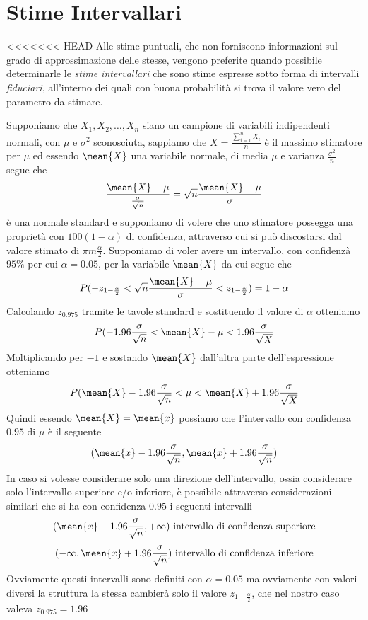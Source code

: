 \documentclass[a4paper,12pt, oneside]{book}
\begin{document}
\section{Stime Intervallari}
<<<<<<< HEAD
Alle stime puntuali, che non forniscono informazioni sul grado di approssimazione delle stesse, vengono preferite quando possibile
determinarle le \emph{stime intervallari} che sono stime espresse sotto forma di intervalli \emph{fiduciari}, 
all’interno dei quali con buona probabilità si trova il valore vero del parametro da stimare.\newline

Supponiamo che $X_1, X_2, \dots, X_n$ siano un campione di variabili indipendenti normali, con $\mu$ e $\sigma^2$
sconosciuta, sappiamo che $\overline{X} = \frac{\sum _{i = 1}^n X_i}{n}$ è il massimo stimatore per $\mu$ ed essendo
$\mean{X}$ una variabile normale, di media $\mu$ e varianza $\frac{\sigma^2}{n}$ segue che
\[ \frac{\mean{X} - \mu}{\frac{\sigma}{\sqrt{n}}} = \sqrt{n} \frac{\mean{X} - \mu}{\sigma} \]
è una normale standard  e supponiamo di volere che uno stimatore possegga una proprietà con $100(1 - \alpha)$ di
confidenza, attraverso cui si può discostarsi dal valore stimato di $\pi m \frac{\alpha}{2}$.\newline
Supponiamo di voler avere un intervallo, con confidenzà $95\%$ per cui $\alpha = 0.05$, per la variabile $\mean{X}$ 
da cui segue che
\[ P(-z_{1 - \frac{\alpha}{2}} < \sqrt{n} \frac{\mean{X} - \mu}{\sigma} < z_{1 - \frac{\alpha}{2}}) = 1 - \alpha \]
Calcolando $z_{0.975}$ tramite le tavole standard e sostituendo il valore di $\alpha$ otteniamo
\[ P(-1.96 \frac{\sigma}{\sqrt{n}} < \mean{X} - \mu < 1.96 \frac{\sigma}{\sqrt{X}} \]
Moltiplicando per $-1$ e sostando $\mean{X}$ dall'altra parte dell'espressione otteniamo
\[ P(\mean{X} - 1.96 \frac{\sigma}{\sqrt{n}} < \mu < \mean{X} + 1.96 \frac{\sigma}{\sqrt{X}} \]
Quindi essendo $\mean{X} = \mean{x}$ possiamo che l'intervallo con confidenza $0.95$ di $\mu$ è il seguente
\[ (\mean{x} - 1.96 \frac{\sigma}{\sqrt{n}}, \mean{x} + 1.96 \frac{\sigma}{\sqrt{n}}) \]
In caso si volesse considerare solo una direzione dell'intervallo, ossia considerare solo l'intervallo superiore e/o
inferiore, è possibile attraverso considerazioni similari che si ha con confidenza $0.95$ i seguenti intervalli
\[ (\mean{x} - 1.96 \frac{\sigma}{\sqrt{n}}, +\infty) \mbox { intervallo di confidenza superiore} \]
\[ (-\infty, \mean{x} + 1.96 \frac{\sigma}{\sqrt{n}}) \mbox { intervallo di confidenza inferiore} \]
Ovviamente questi intervalli sono definiti con $\alpha = 0.05$ ma ovviamente con valori diversi la struttura la stessa 
cambierà solo il valore $z_{1 - \frac{\alpha}{2}}$, che nel nostro caso valeva $z_{0.975} = 1.96$
\end{document}
